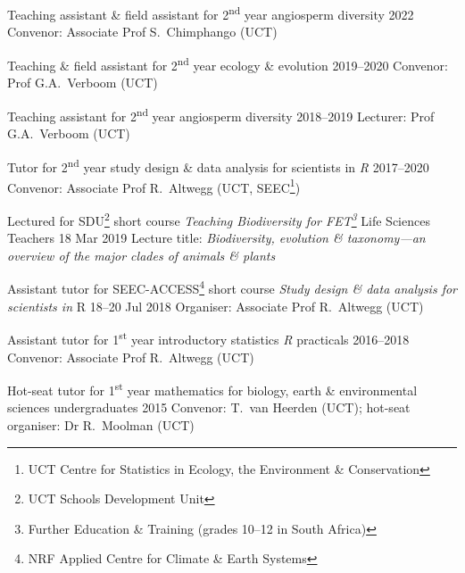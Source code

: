 \documentclass[10pt]{article}
\begin{document}

\begin{hangparas}{2em}{1}

Teaching assistant \& field assistant for 2\textsuperscript{nd} year angiosperm
diversity                                                     \hfill 2022 \break
Convenor: Associate Prof S.~Chimphango (UCT)

Teaching \& field assistant for 2\textsuperscript{nd} year ecology \& evolution
                                                        \hfill 2019--2020 \break
Convenor: Prof G.A.~Verboom (UCT)

Teaching assistant for 2\textsuperscript{nd} year angiosperm diversity
                                                        \hfill 2018--2019 \break
Lecturer: Prof G.A.~Verboom (UCT)

Tutor for 2\textsuperscript{nd} year study design \& data analysis for 
scientists in \textit{R}                                \hfill 2017--2020 \break
Convenor: Associate Prof R.~Altwegg (UCT, SEEC\footnote{UCT Centre for 
Statistics in Ecology, the Environment \& Conservation})

Lectured for SDU\footnote{UCT Schools Development Unit} short course 
\textit{Teaching Biodiversity for FET\footnote{Further Education \& Training
(grades 10--12 in South Africa)}} Life Sciences Teachers
                                                       \hfill 18 Mar 2019 \break
Lecture title: \textit{Biodiversity, evolution \& taxonomy---an overview of the 
major clades of animals \& plants}

Assistant tutor for SEEC-ACCESS\footnote{NRF Applied Centre for Climate \&
Earth Systems} short course \textit{Study design \& data analysis for 
scientists in} R                                   \hfill 18--20 Jul 2018 \break
Organiser: Associate Prof R.~Altwegg (UCT)

Assistant tutor for 1\textsuperscript{st} year introductory statistics
\textit{R} practicals                                   \hfill 2016--2018 \break
Convenor: Associate Prof R.~Altwegg (UCT)

Hot-seat tutor for 1\textsuperscript{st} year mathematics for biology, earth \& 
environmental sciences undergraduates                         \hfill 2015 \break
Convenor: T.~van Heerden (UCT); hot-seat organiser: Dr R.~Moolman (UCT)

\hfill

\end{hangparas}
\end{document}
